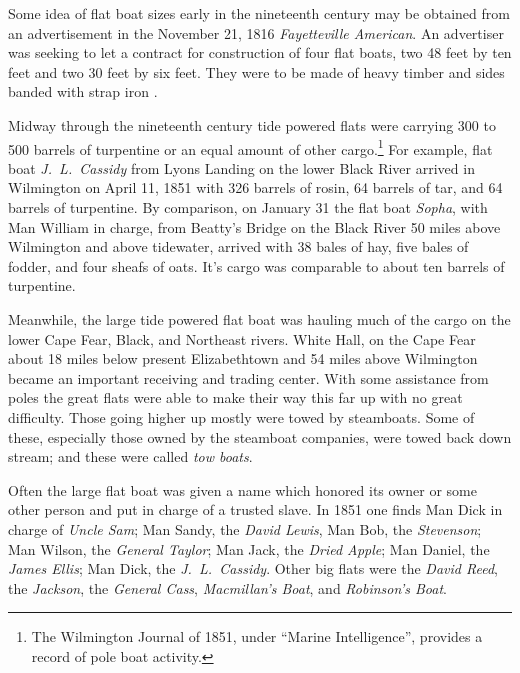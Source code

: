 \documentclass[11pt, a5paper]{book}
\begin{document}
Some idea of flat boat sizes early in the nineteenth century may be
obtained from an advertisement in the November 21, 1816
\textit{Fayetteville American}.  An advertiser was seeking to let a
contract for construction of four flat boats, two 48 feet by ten feet
and two 30 feet by six feet.  They were to be made of heavy timber and
sides banded with strap iron \citep[11-21-16]{fa}.\par

Midway through the nineteenth century tide powered flats were carrying
300 to 500 barrels of turpentine or an equal amount of other
cargo.\footnote{The Wilmington Journal of 1851, under ``Marine
  Intelligence'', provides a record of pole boat activity.}  For
example, flat boat \textit{J.~L.~Cassidy} from Lyons Landing on the
lower Black River arrived in Wilmington on April 11, 1851 with 326
barrels of rosin, 64 barrels of tar, and 64 barrels of turpentine.  By
comparison, on January 31 the flat boat \textit{Sopha}, with Man
William in charge, from Beatty's Bridge on the Black River 50 miles
above Wilmington and above tidewater, arrived with 38 bales of hay,
five bales of fodder, and four sheafs of oats.  It's cargo was
comparable to about ten barrels of turpentine.\par

Meanwhile, the large tide powered flat boat was hauling much of the
cargo on the lower Cape Fear, Black, and Northeast rivers.  White
Hall, on the Cape Fear about 18 miles below present Elizabethtown and
54 miles above Wilmington became an important receiving and trading
center.  With some assistance from poles the great flats were able to
make their way this far up with no great difficulty.  Those going
higher up mostly were towed by steamboats.  Some of these, especially
those owned by the steamboat companies, were towed back down stream;
and these were called \textit{tow boats}.\par

Often the large flat boat was given a name which honored its owner or
some other person and put in charge of a trusted slave.  In 1851 one
finds Man Dick in charge of \textit{Uncle Sam}; Man Sandy, the
\textit{David Lewis}, Man Bob, the \textit{Stevenson}; Man Wilson, the
\textit{General Taylor}; Man Jack, the \textit{Dried Apple}; Man
Daniel, the \textit{James Ellis}; Man Dick, the
\textit{J.~L.~Cassidy}.  Other big flats were the \textit{David Reed},
the \textit{Jackson}, the \textit{General Cass}, \textit{Macmillan's
  Boat}, and \textit{Robinson's Boat}.\par
\end{document}
